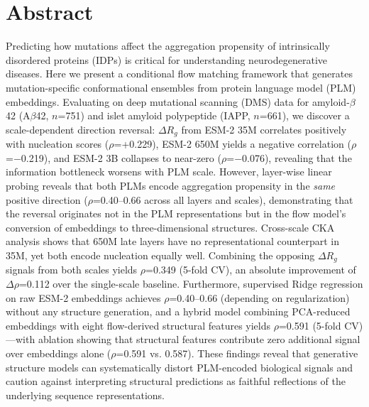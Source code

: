 \documentclass[10pt,letterpaper]{article}
\begin{document}
\section*{Abstract}

Predicting how mutations affect the aggregation propensity of intrinsically disordered proteins (IDPs) is critical for understanding neurodegenerative diseases. Here we present a conditional flow matching framework that generates mutation-specific conformational ensembles from protein language model (PLM) embeddings. Evaluating on deep mutational scanning (DMS) data for amyloid-$\beta$ 42 (A$\beta$42, $n$=751) and islet amyloid polypeptide (IAPP, $n$=661), we discover a scale-dependent direction reversal: $\Delta R_g$ from ESM-2 35M correlates positively with nucleation scores ($\rho$=+0.229), ESM-2 650M yields a negative correlation ($\rho$=$-$0.219), and ESM-2 3B collapses to near-zero ($\rho$=$-$0.076), revealing that the information bottleneck worsens with PLM scale. However, layer-wise linear probing reveals that both PLMs encode aggregation propensity in the \textit{same} positive direction ($\rho$=0.40--0.66 across all layers and scales), demonstrating that the reversal originates not in the PLM representations but in the flow model's conversion of embeddings to three-dimensional structures. Cross-scale CKA analysis shows that 650M late layers have no representational counterpart in 35M, yet both encode nucleation equally well. Combining the opposing $\Delta R_g$ signals from both scales yields $\rho$=0.349 (5-fold CV), an absolute improvement of $\Delta\rho$=0.112 over the single-scale baseline. Furthermore, supervised Ridge regression on raw ESM-2 embeddings achieves $\rho$=0.40--0.66 (depending on regularization) without any structure generation, and a hybrid model combining PCA-reduced embeddings with eight flow-derived structural features yields $\rho$=0.591 (5-fold CV)---with ablation showing that structural features contribute zero additional signal over embeddings alone ($\rho$=0.591 vs. 0.587). These findings reveal that generative structure models can systematically distort PLM-encoded biological signals and caution against interpreting structural predictions as faithful reflections of the underlying sequence representations.

\end{document}
